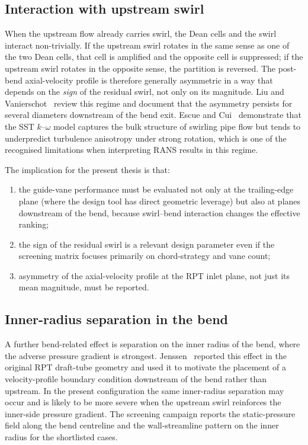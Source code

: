 \subsection{Interaction with upstream swirl}
\label{sec:theory_swirl_bend_interaction}
 
When the upstream flow already carries swirl, the Dean cells and the swirl interact non-trivially. If the upstream swirl rotates in the same sense as one of the two Dean cells, that cell is amplified and the opposite cell is suppressed; if the upstream swirl rotates in the opposite sense, the partition is reversed. The post-bend axial-velocity profile is therefore generally asymmetric in a way that depends on the \emph{sign} of the residual swirl, not only on its magnitude. Liu and Vanierschot~\cite{LiuVanierschot2021} review this regime and document that the asymmetry persists for several diameters downstream of the bend exit. Escue and Cui~\cite{EscueCui2010} demonstrate that the SST $k$--$\omega$ model captures the bulk structure of swirling pipe flow but tends to underpredict turbulence anisotropy under strong rotation, which is one of the recognised limitations when interpreting RANS results in this regime.
 
The implication for the present thesis is that:
\begin{enumerate}
  \item the guide-vane performance must be evaluated not only at the trailing-edge plane (where the design tool has direct geometric leverage) but also at planes downstream of the bend, because swirl--bend interaction changes the effective ranking;
  \item the sign of the residual swirl is a relevant design parameter even if the screening matrix focuses primarily on chord-strategy and vane count;
  \item asymmetry of the axial-velocity profile at the RPT inlet plane, not just its mean magnitude, must be reported.
\end{enumerate}
 
\subsection{Inner-radius separation in the bend}
\label{sec:theory_bend_separation}
 
A further bend-related effect is separation on the inner radius of the bend, where the adverse pressure gradient is strongest. Jenssen~\cite{Jenssen2020} reported this effect in the original RPT draft-tube geometry and used it to motivate the placement of a velocity-profile boundary condition downstream of the bend rather than upstream. In the present configuration the same inner-radius separation may occur and is likely to be more severe when the upstream swirl reinforces the inner-side pressure gradient. The screening campaign reports the static-pressure field along the bend centreline and the wall-streamline pattern on the inner radius for the shortlisted cases.
 
